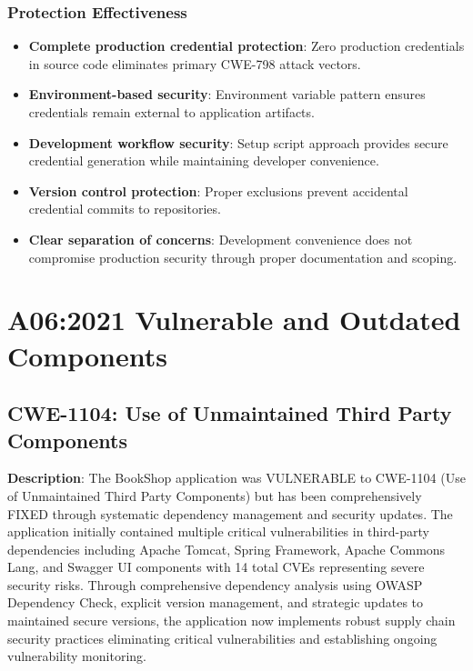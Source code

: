 \documentclass[]{UCD_CS_FYP_Report}
\begin{document}
\subsection{Protection Effectiveness}
\begin{itemize}
	\item \textbf{Complete production credential protection}: Zero production credentials in source code eliminates primary CWE-798 attack vectors.
	\item \textbf{Environment-based security}: Environment variable pattern ensures credentials remain external to application artifacts.
	\item \textbf{Development workflow security}: Setup script approach provides secure credential generation while maintaining developer convenience.
	\item \textbf{Version control protection}: Proper exclusions prevent accidental credential commits to repositories.
	\item \textbf{Clear separation of concerns}: Development convenience does not compromise production security through proper documentation and scoping.
\end{itemize}



\chapter{A06:2021 Vulnerable and Outdated Components}

\section{CWE-1104: Use of Unmaintained Third Party Components}

\textbf{Description}: The BookShop application was VULNERABLE to CWE-1104 (Use of Unmaintained Third Party Components) but has been comprehensively FIXED through systematic dependency management and security updates. The application initially contained multiple critical vulnerabilities in third-party dependencies including Apache Tomcat, Spring Framework, Apache Commons Lang, and Swagger UI components with 14 total CVEs representing severe security risks. Through comprehensive dependency analysis using OWASP Dependency Check, explicit version management, and strategic updates to maintained secure versions, the application now implements robust supply chain security practices eliminating critical vulnerabilities and establishing ongoing vulnerability monitoring.
\end{document}

